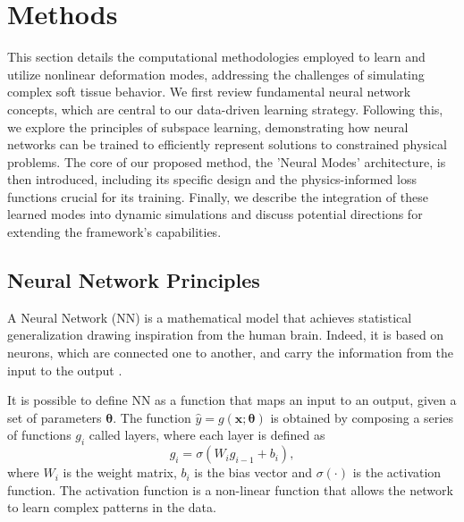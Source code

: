 \section{Methods}
\label{sec:methods}

This section details the computational methodologies employed to learn and utilize nonlinear deformation modes, addressing the challenges of simulating complex soft tissue behavior. We first review fundamental neural network concepts, which are central to our data-driven learning strategy. Following this, we explore the principles of subspace learning, demonstrating how neural networks can be trained to efficiently represent solutions to constrained physical problems. The core of our proposed method, the 'Neural Modes' architecture, is then introduced, including its specific design and the physics-informed loss functions crucial for its training. Finally, we describe the integration of these learned modes into dynamic simulations and discuss potential directions for extending the framework's capabilities.



\subsection{Neural Network Principles}

A Neural Network (NN) is a mathematical model that achieves statistical generalization drawing inspiration from the human brain. Indeed, it is based on neurons, which are connected one to another, and carry the information from the input to the output \cite{Goodfellow-et-al-2016}.

It is possible to define NN as a function that maps an input to an output, given a set of parameters \( \bm{\theta} \). The function \( \hat{y} = g(\bm{x}; \bm{\theta}) \) is obtained by composing a series of functions \( g_i \) called layers, where each layer is defined as
\begin{equation}
    g_i = \sigma(W_i g_{i-1} + b_i),
\end{equation}
where \( W_i \) is the weight matrix, \( b_i \) is the bias vector and \( \sigma(\cdot) \) is the activation function. The activation function is a non-linear function that allows the network to learn complex patterns in the data.

